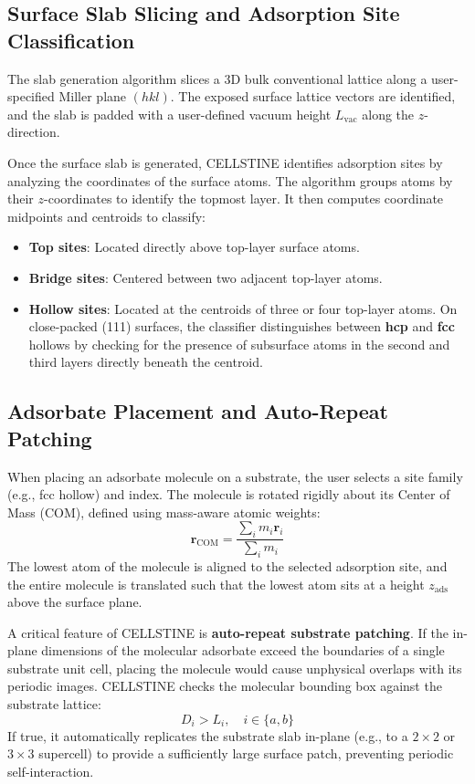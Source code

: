 \documentclass[9pt,a4paper,twoside]{tau-class/tau}
\begin{document}
\subsection{Surface Slab Slicing and Adsorption Site Classification}
The slab generation algorithm slices a 3D bulk conventional lattice along a user-specified Miller plane $(hkl)$. The exposed surface lattice vectors are identified, and the slab is padded with a user-defined vacuum height $L_{\text{vac}}$ along the $z$-direction.

Once the surface slab is generated, CELLSTINE identifies adsorption sites by analyzing the coordinates of the surface atoms. The algorithm groups atoms by their $z$-coordinates to identify the topmost layer. It then computes coordinate midpoints and centroids to classify:
\begin{itemize}[leftmargin=*]
    \item \textbf{Top sites}: Located directly above top-layer surface atoms.
    \item \textbf{Bridge sites}: Centered between two adjacent top-layer atoms.
    \item \textbf{Hollow sites}: Located at the centroids of three or four top-layer atoms. On close-packed (111) surfaces, the classifier distinguishes between \textbf{hcp} and \textbf{fcc} hollows by checking for the presence of subsurface atoms in the second and third layers directly beneath the centroid.
\end{itemize}

\subsection{Adsorbate Placement and Auto-Repeat Patching}
When placing an adsorbate molecule on a substrate, the user selects a site family (e.g., fcc hollow) and index. The molecule is rotated rigidly about its Center of Mass (COM), defined using mass-aware atomic weights:
\begin{equation}
    \mathbf{r}_{\text{COM}} = \frac{\sum_i m_i \mathbf{r}_i}{\sum_i m_i}
\end{equation}
The lowest atom of the molecule is aligned to the selected adsorption site, and the entire molecule is translated such that the lowest atom sits at a height $z_{\text{ads}}$ above the surface plane.

A critical feature of CELLSTINE is \textbf{auto-repeat substrate patching}. If the in-plane dimensions of the molecular adsorbate exceed the boundaries of a single substrate unit cell, placing the molecule would cause unphysical overlaps with its periodic images. CELLSTINE checks the molecular bounding box against the substrate lattice:
\begin{equation}
    D_{i} > L_{i}, \quad i \in \{a, b\}
\end{equation}
If true, it automatically replicates the substrate slab in-plane (e.g., to a $2\times2$ or $3\times3$ supercell) to provide a sufficiently large surface patch, preventing periodic self-interaction.
\end{document}
